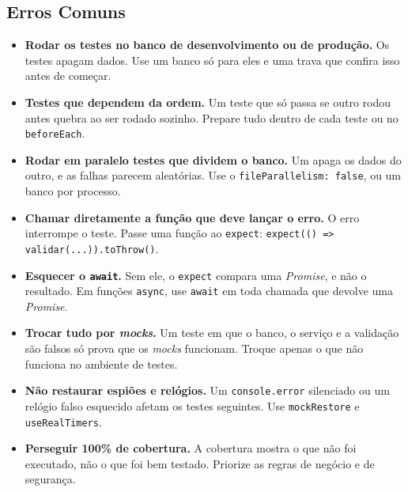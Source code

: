 \subsection{Erros Comuns}

\begin{itemize}
  \item \textbf{Rodar os testes no banco de desenvolvimento ou de produção.} Os testes apagam dados. Use um banco só para eles e uma trava que confira isso antes de começar.
  \item \textbf{Testes que dependem da ordem.} Um teste que só passa se outro rodou antes quebra ao ser rodado sozinho. Prepare tudo dentro de cada teste ou no \texttt{beforeEach}.
  \item \textbf{Rodar em paralelo testes que dividem o banco.} Um apaga os dados do outro, e as falhas parecem aleatórias. Use o \texttt{fileParallelism: false}, ou um banco por processo.
  \item \textbf{Chamar diretamente a função que deve lançar o erro.} O erro interrompe o teste. Passe uma função ao \texttt{expect}: \texttt{expect(() => validar(...)).toThrow()}.
  \item \textbf{Esquecer o \texttt{await}.} Sem ele, o \texttt{expect} compara uma \textit{Promise}, e não o resultado. Em funções \texttt{async}, use \texttt{await} em toda chamada que devolve uma \textit{Promise}.
  \item \textbf{Trocar tudo por \textit{mocks}.} Um teste em que o banco, o serviço e a validação são falsos só prova que os \textit{mocks} funcionam. Troque apenas o que não funciona no ambiente de testes.
  \item \textbf{Não restaurar espiões e relógios.} Um \texttt{console.error} silenciado ou um relógio falso esquecido afetam os testes seguintes. Use \texttt{mockRestore} e \texttt{useRealTimers}.
  \item \textbf{Perseguir 100\% de cobertura.} A cobertura mostra o que não foi executado, não o que foi bem testado. Priorize as regras de negócio e de segurança.
\end{itemize}
